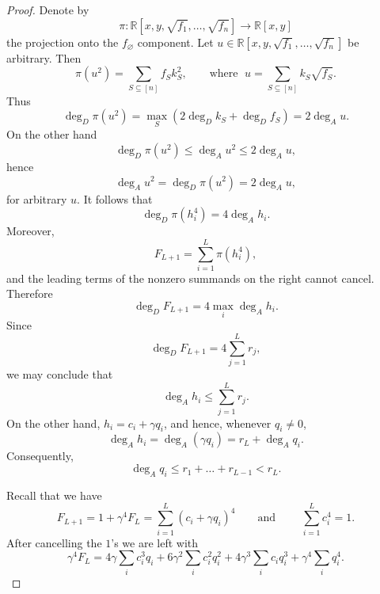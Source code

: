 \documentclass[12pt,reqno]{amsart}   	%
\theoremstyle{remark}
\newcommand{\R}{\mathbb{R}}
\begin{document}
\begin{proof}
    Denote by
    \[
    \pi:\R[x,y,\sqrt{f_1},\ldots,\sqrt{f_n}]\longrightarrow\R[x,y]
    \]
    the projection onto the $f_\varnothing$ component. Let $u\in \R[x,y,\sqrt{f_1},\ldots,\sqrt{f_n}]$ be arbitrary. Then
    \[
    \pi(u^2) = \sum_{S\subseteq[n]}f_S k_{S}^2,\qquad\text{where }\; u=\sum_{S\subseteq[n]} k_S\sqrt{f_S}.
    \]
    Thus
    \[
    \deg_D \pi(u^2) = \max_S(2\deg_D k_{S}+ \deg_D f_S) = 2\deg_A u.
    \]
    On the other hand
    \[
    \deg_D \pi(u^2)\leq \deg_A u^2\leq 2\deg_A u,
    \]
    hence
    \[
    \deg_A u^2 = \deg_D \pi(u^2) = 2\deg_A u,
    \]
    for arbitrary $u$. It follows that
    \[
    \deg_D \pi(h_i^4) = 4\deg_A h_i.
    \]
    Moreover,
    \[
    F_{L+1} = \sum_{i=1}^L\pi(h_i^4),
    \]
    and the leading terms of the nonzero summands on the right cannot cancel. Therefore
    \[
    \deg_DF_{L+1} = 4\max_i\deg_Ah_i.
    \]
    Since
    \[
    \deg_DF_{L+1}=4\sum_{j=1}^Lr_j,
    \]
    we may conclude that
    \[
    \deg_Ah_i\leq\sum_{j=1}^Lr_j.
    \]
    On the other hand, $h_i=c_i+\gamma q_i$, and hence, whenever $q_i\neq 0$,
    \[
            \deg_Ah_i  =  \deg_A(\gamma q_i)   =   r_L+\deg_Aq_i.
    \]
    Consequently,
    \begin{equation}
        \deg_A q_i \leq r_1+\dots+r_{L-1}<r_L.
            \label{q-degree-bound}
    \end{equation}
    
    Recall that we have
    \[
    F_{L+1}=1+\gamma^4F_L = \sum_{i=1}^L(c_i+\gamma q_i)^4\qquad\text{and }
    \qquad\sum_{i=1}^L c_i^4=1.
    \]
    After cancelling the $1$'s we are left with
    \begin{equation}
            \gamma^4F_L =
        4\gamma\sum_i c_i^3q_i
        +6\gamma^2\sum_i c_i^2q_i^2
        +4\gamma^3\sum_i c_iq_i^3
        +\gamma^4\sum_i q_i^4.
            \label{main-fourth-equation}
    \end{equation}


\end{proof}
\end{document}
